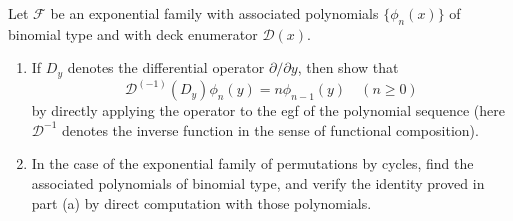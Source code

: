 \begin{exercise}
    Let $\mathcal{F}$ be an exponential family with associated polynomials $\{\phi_n(x)\}$ of binomial type and with deck enumerator $\mathcal{D}(x)$.
    \begin{enumerate}[label=(\alph*)]
        \item If $D_y$ denotes the differential operator $\partial/\partial y$, then show that
        \[
            \mathcal{D}^{(-1)}(D_y)\phi_n(y) = n\phi_{n-1}(y) \quad (n\geq 0)
        \]
        by directly applying the operator to the egf of the polynomial sequence (here $\mathcal{D}^{-1}$ denotes the inverse function in the sense of functional composition).
        \item In the case of the exponential family of permutations by cycles, find the associated polynomials of binomial type, and verify the identity proved in part (a) by direct computation with those polynomials.
    \end{enumerate}
\end{exercise}
